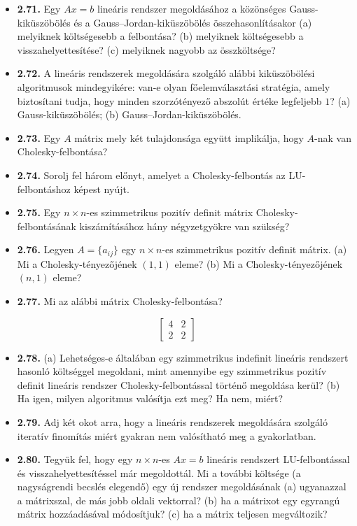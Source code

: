 \documentclass[
  magyar,
  11pt]{article}
\providecommand{\tightlist}{%
  \setlength{\itemsep}{0pt}\setlength{\parskip}{0pt}}
\begin{document}
\begin{itemize}
  \textbf{2.70.} (a) Mennyi tárhely szükséges egy egyrangú
  \(n \times n\)-es mátrix hatékony tárolásához? (b) Hány aritmetikai
  művelet szükséges egy \(n\)-dimenziós vektor és egy egyrangú
  \(n \times n\)-es mátrix szorzatának hatékony kiszámításához?
\item
  \textbf{2.71.} Egy \(Ax = b\) lineáris rendszer megoldásához a
  közönséges Gauss-kiküszöbölés és a Gauss--Jordan-kiküszöbölés
  összehasonlításakor (a) melyiknek költségesebb a felbontása? (b)
  melyiknek költségesebb a visszahelyettesítése? (c) melyiknek nagyobb
  az összköltsége?
\item
  \textbf{2.72.} A lineáris rendszerek megoldására szolgáló alábbi
  kiküszöbölési algoritmusok mindegyikére: van-e olyan főelemválasztási
  stratégia, amely biztosítani tudja, hogy minden szorzótényező abszolút
  értéke legfeljebb \(1\)? (a) Gauss-kiküszöbölés; (b)
  Gauss--Jordan-kiküszöbölés.
\item
  \textbf{2.73.} Egy \(A\) mátrix mely két tulajdonsága együtt
  implikálja, hogy \(A\)-nak van Cholesky-felbontása?
\item
  \textbf{2.74.} Sorolj fel három előnyt, amelyet a Cholesky-felbontás
  az LU-felbontáshoz képest nyújt.
\item
  \textbf{2.75.} Egy \(n \times n\)-es szimmetrikus pozitív definit
  mátrix Cholesky-felbontásának kiszámításához hány négyzetgyökre van
  szükség?
\item
  \textbf{2.76.} Legyen \(A = \{a_{ij}\}\) egy \(n \times n\)-es
  szimmetrikus pozitív definit mátrix. (a) Mi a Cholesky-tényezőjének
  \((1,1)\) eleme? (b) Mi a Cholesky-tényezőjének \((n,1)\) eleme?
\item
  \textbf{2.77.} Mi az alábbi mátrix Cholesky-felbontása?
\end{itemize}

\[\begin{bmatrix} 4 & 2 \\ 2 & 2 \end{bmatrix}\]

\begin{itemize}
\tightlist
\item
  \textbf{2.78.} (a) Lehetséges-e általában egy szimmetrikus indefinit
  lineáris rendszert hasonló költséggel megoldani, mint amennyibe egy
  szimmetrikus pozitív definit lineáris rendszer Cholesky-felbontással
  történő megoldása kerül? (b) Ha igen, milyen algoritmus valósítja ezt
  meg? Ha nem, miért?
\item
  \textbf{2.79.} Adj két okot arra, hogy a lineáris rendszerek
  megoldására szolgáló iteratív finomítás miért gyakran nem valósítható
  meg a gyakorlatban.
\item
  \textbf{2.80.} Tegyük fel, hogy egy \(n \times n\)-es \(Ax = b\)
  lineáris rendszert LU-felbontással és visszahelyettesítéssel már
  megoldottál. Mi a további költsége (a nagyságrendi becslés elegendő)
  egy új rendszer megoldásának (a) ugyanazzal a mátrixszal, de más jobb
  oldali vektorral? (b) ha a mátrixot egy egyrangú mátrix hozzáadásával
  módosítjuk? (c) ha a mátrix teljesen megváltozik?
\end{itemize}
\end{document}
